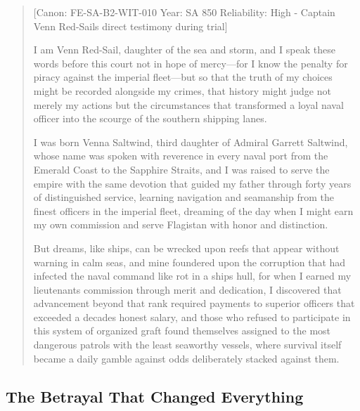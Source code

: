 \begin{quote}
{[}Canon: FE-SA-B2-WIT-010 \textbar{} Year: SA 850 \textbar{}
Reliability: High - Captain Venn Red-Sail\textquotesingle s direct
testimony during trial{]}

I am Venn Red-Sail, daughter of the sea and storm, and I speak these
words before this court not in hope of mercy---for I know the penalty
for piracy against the imperial fleet---but so that the truth of my
choices might be recorded alongside my crimes, that history might judge
not merely my actions but the circumstances that transformed a loyal
naval officer into the scourge of the southern shipping lanes.

I was born Venna Saltwind, third daughter of Admiral Garrett Saltwind,
whose name was spoken with reverence in every naval port from the
Emerald Coast to the Sapphire Straits, and I was raised to serve the
empire with the same devotion that guided my father through forty years
of distinguished service, learning navigation and seamanship from the
finest officers in the imperial fleet, dreaming of the day when I might
earn my own commission and serve Flagistan with honor and distinction.

But dreams, like ships, can be wrecked upon reefs that appear without
warning in calm seas, and mine foundered upon the corruption that had
infected the naval command like rot in a ship\textquotesingle s hull,
for when I earned my lieutenant\textquotesingle s commission through
merit and dedication, I discovered that advancement beyond that rank
required payments to superior officers that exceeded a
decade\textquotesingle s honest salary, and those who refused to
participate in this system of organized graft found themselves assigned
to the most dangerous patrols with the least seaworthy vessels, where
survival itself became a daily gamble against odds deliberately stacked
against them.
\end{quote}

\subsection{The Betrayal That Changed
Everything}\label{the-betrayal-that-changed-everything}

